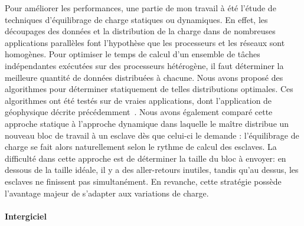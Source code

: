 \documentclass[11pt]{article}
\begin{document}
Pour améliorer les performances, une partie de mon travail à été l'étude de 
techniques d'équilibrage de charge statiques ou dynamiques.  En effet, les 
découpages des données et la distribution de la charge dans de nombreuses 
applications parallèles font l'hypothèse que les processeurs et les réseaux 
sont homogènes. Pour optimiser le temps de calcul d'un ensemble de tâches
indépendantes exécutées sur des processeurs hétérogène, il faut déterminer la 
meilleure quantité de données distribuées à chacune. Nous avons proposé des 
algorithmes pour déterminer statiquement de telles distributions optimales. Ces
algorithmes ont été testés sur de vraies applications, dont l'application de 
géophysique décrite précédemment~\cite{icps-2002-62,icps-2003-75,icps-2004-125}. 
Nous avons également comparé cette approche statique à l'approche dynamique 
dans laquelle le maître distribue un nouveau bloc de travail à un esclave dès 
que celui-ci le demande : l'équilibrage de charge se fait alors naturellement 
selon le rythme de calcul des esclaves. La difficulté dans cette approche est 
de déterminer la taille du bloc à envoyer: en dessous de la taille idéale, il y 
a des aller-retours inutiles, tandis qu'au dessus, les esclaves ne finissent 
pas simultanément. En revanche, cette stratégie possède l'avantage majeur
de s'adapter aux variations de charge.


\paragraph{Intergiciel}
\end{document}
